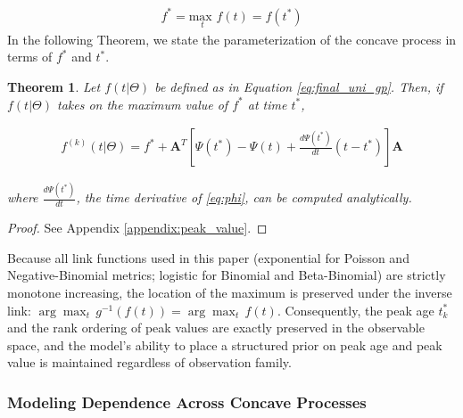\documentclass[aoas]{imsart}
\newtheorem{theorem}{Theorem}
\begin{document}
\begin{align}
f^* = \underset{t}{\text{max }} f(t) = f(t^*) 
\end{align}
%
In the following Theorem, we state the parameterization of the concave process in terms of $f^*$ and $t^*$.
%
\begin{theorem}\label{theorem:concave_max_approx}
Let $f(t | \Theta)$
be defined as in Equation \eqref{eq:final_uni_gp}. Then, if $f(t | \Theta)$ takes on the maximum value of $f^*$ at time $t^*$,  

\begin{align}
\label{eq:max_constraint_gp}
    f^{(k)}(t | \Theta) = f^* + \mathbf{A}^T [ \Psi(t^*) - \Psi(t) + \frac{d\Psi(t^*)}{dt}(t - t^*) ] \mathbf{A}  
\end{align}

where $\frac{d\Psi(t^*)}{dt}$, the time derivative of \eqref{eq:phi}, can be computed analytically.
\end{theorem}
\begin{proof}
See Appendix \ref{appendix:peak_value}.
\end{proof}



Because all link functions used in this paper (exponential for Poisson and Negative-Binomial metrics; logistic for Binomial and Beta-Binomial) are strictly monotone increasing, the location of the maximum is preserved under the inverse link: $\arg\max_t \, g^{-1}(f(t)) = \arg\max_t \, f(t)$.  Consequently, the peak age $t^*_k$ and the rank ordering of peak values are exactly preserved in the observable space, and the model's ability to place a structured prior on peak age and peak value is maintained regardless of observation family.


\subsubsection{Modeling Dependence Across Concave Processes}
\end{document}
